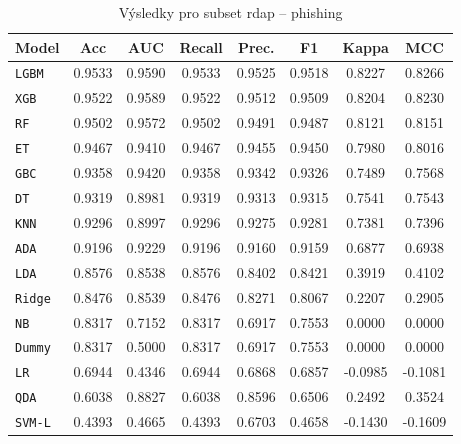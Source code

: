 \begin{table}[H]
  \centering
  \small
  \caption{Výsledky pro subset rdap – phishing}
  \begin{tabular}{|l|c|c|c|c|c|c|c|}
    \hline
    \textbf{Model} & \textbf{Acc} & \textbf{AUC} & \textbf{Recall} & \textbf{Prec.} & \textbf{F1} & \textbf{Kappa} & \textbf{MCC} \\
    \hline
    \texttt{LGBM} & 0.9533 & 0.9590 & 0.9533 & 0.9525 & 0.9518 & 0.8227 & 0.8266 \\
    \texttt{XGB} & 0.9522 & 0.9589 & 0.9522 & 0.9512 & 0.9509 & 0.8204 & 0.8230 \\
    \texttt{RF} & 0.9502 & 0.9572 & 0.9502 & 0.9491 & 0.9487 & 0.8121 & 0.8151 \\
    \texttt{ET} & 0.9467 & 0.9410 & 0.9467 & 0.9455 & 0.9450 & 0.7980 & 0.8016 \\
    \texttt{GBC} & 0.9358 & 0.9420 & 0.9358 & 0.9342 & 0.9326 & 0.7489 & 0.7568 \\
    \texttt{DT} & 0.9319 & 0.8981 & 0.9319 & 0.9313 & 0.9315 & 0.7541 & 0.7543 \\
    \texttt{KNN} & 0.9296 & 0.8997 & 0.9296 & 0.9275 & 0.9281 & 0.7381 & 0.7396 \\
    \texttt{ADA} & 0.9196 & 0.9229 & 0.9196 & 0.9160 & 0.9159 & 0.6877 & 0.6938 \\
    \texttt{LDA} & 0.8576 & 0.8538 & 0.8576 & 0.8402 & 0.8421 & 0.3919 & 0.4102 \\
    \texttt{Ridge} & 0.8476 & 0.8539 & 0.8476 & 0.8271 & 0.8067 & 0.2207 & 0.2905 \\
    \texttt{NB} & 0.8317 & 0.7152 & 0.8317 & 0.6917 & 0.7553 & 0.0000 & 0.0000 \\
    \texttt{Dummy} & 0.8317 & 0.5000 & 0.8317 & 0.6917 & 0.7553 & 0.0000 & 0.0000 \\
    \texttt{LR} & 0.6944 & 0.4346 & 0.6944 & 0.6868 & 0.6857 & -0.0985 & -0.1081 \\
    \texttt{QDA} & 0.6038 & 0.8827 & 0.6038 & 0.8596 & 0.6506 & 0.2492 & 0.3524 \\
    \texttt{SVM-L} & 0.4393 & 0.4665 & 0.4393 & 0.6703 & 0.4658 & -0.1430 & -0.1609 \\
    \hline
  \end{tabular}
\end{table}
\vspace{0.5cm}


